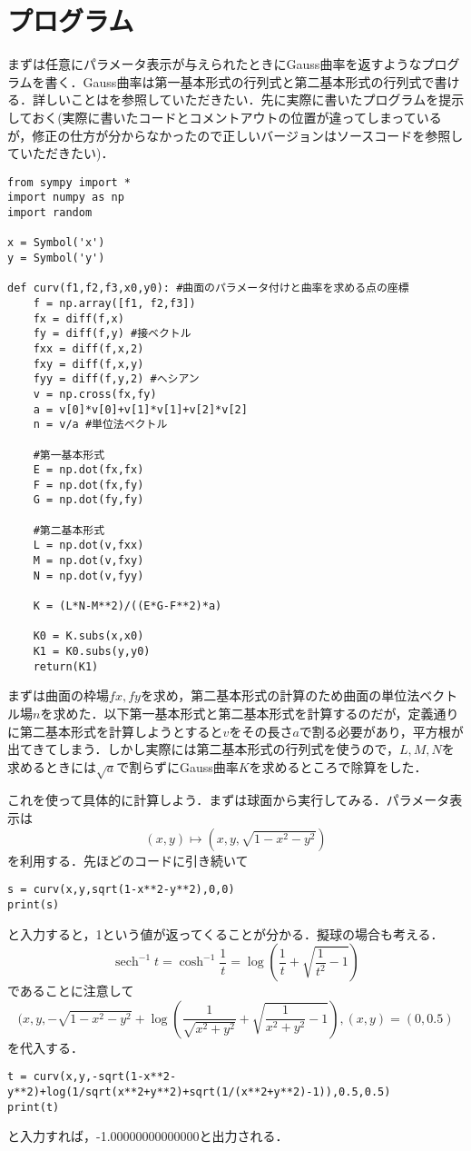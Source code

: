 \documentclass{jsarticle}
\theoremstyle{definition}
\newcommand{\sech}{\operatorname{sech}}
\begin{document}
\section{プログラム}
まずは任意にパラメータ表示が与えられたときにGauss曲率を返すようなプログラムを書く．Gauss曲率は第一基本形式の行列式と第二基本形式の行列式で書ける．詳しいことは\cite{今野}を参照していただきたい．先に実際に書いたプログラムを提示しておく(実際に書いたコードとコメントアウトの位置が違ってしまっているが，修正の仕方が分からなかったので正しいバージョンはソースコードを参照していただきたい)．
\begin{lstlisting}[basicstyle=\ttfamily\footnotesize, frame=single]
from sympy import *
import numpy as np
import random

x = Symbol('x')
y = Symbol('y')

def curv(f1,f2,f3,x0,y0): #曲面のパラメータ付けと曲率を求める点の座標
    f = np.array([f1, f2,f3])
    fx = diff(f,x)
    fy = diff(f,y) #接ベクトル
    fxx = diff(f,x,2)
    fxy = diff(f,x,y)
    fyy = diff(f,y,2) #ヘシアン
    v = np.cross(fx,fy)
    a = v[0]*v[0]+v[1]*v[1]+v[2]*v[2]
    n = v/a #単位法ベクトル
    
    #第一基本形式
    E = np.dot(fx,fx)
    F = np.dot(fx,fy)
    G = np.dot(fy,fy)
    
    #第二基本形式
    L = np.dot(v,fxx)
    M = np.dot(v,fxy)
    N = np.dot(v,fyy)
    
    K = (L*N-M**2)/((E*G-F**2)*a)
    
    K0 = K.subs(x,x0)
    K1 = K0.subs(y,y0)
    return(K1)
\end{lstlisting}
まずは曲面の枠場$fx,fy$を求め，第二基本形式の計算のため曲面の単位法ベクトル場$n$を求めた．以下第一基本形式と第二基本形式を計算するのだが，定義通りに第二基本形式を計算しようとすると$v$をその長さ$a$で割る必要があり，平方根が出てきてしまう．しかし実際には第二基本形式の行列式を使うので，$L,M,N$を求めるときには$\sqrt{a}$で割らずにGauss曲率$K$を求めるところで除算をした．

これを使って具体的に計算しよう．まずは球面から実行してみる．パラメータ表示は
\[(x,y)\mapsto (x,y,\sqrt{1-x^2-y^2}) \]
を利用する．先ほどのコードに引き続いて
\begin{lstlisting}[basicstyle=\ttfamily\footnotesize, frame=single]
s = curv(x,y,sqrt(1-x**2-y**2),0,0)
print(s)
\end{lstlisting}
と入力すると，1という値が返ってくることが分かる．擬球の場合も考える．
\[ \sech^{-1} t = \cosh^{-1} \frac{1}{t} = \log\left(\frac{1}{t}+\sqrt{\frac{1}{t^2}-1}\right) \]
であることに注意して
\[ (x,y,-\sqrt{1-x^2-y^2}+ \log\left(\frac{1}{\sqrt{x^2+y^2}}+\sqrt{\frac{1}{x^2+y^2}-1}\right), (x,y)=(0,0.5) \]
を代入する．
\begin{lstlisting}[basicstyle=\ttfamily\footnotesize, frame=single]
t = curv(x,y,-sqrt(1-x**2-y**2)+log(1/sqrt(x**2+y**2)+sqrt(1/(x**2+y**2)-1)),0.5,0.5)
print(t)
\end{lstlisting}
と入力すれば，-1.00000000000000と出力される．
\end{document}
